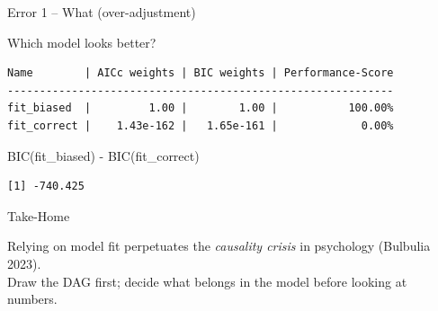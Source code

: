 \documentclass[
  ignorenonframetext,
  aspectratio=169,
]{beamer}
\newenvironment{Shaded}{\begin{snugshade}}{\end{snugshade}}
\newcommand{\FunctionTok}[1]{\textcolor[rgb]{0.28,0.35,0.67}{#1}}
\newcommand{\NormalTok}[1]{\textcolor[rgb]{0.00,0.23,0.31}{#1}}
\newcommand{\SpecialCharTok}[1]{\textcolor[rgb]{0.37,0.37,0.37}{#1}}
\begin{document}
\begin{frame}[fragile]{Error 1 -- What (over-adjustment)}
\begin{block}{Which model looks better?}
\begin{verbatim}
Name        | AICc weights | BIC weights | Performance-Score
------------------------------------------------------------
fit_biased  |         1.00 |        1.00 |           100.00%
fit_correct |    1.43e-162 |   1.65e-161 |             0.00%
\end{verbatim}

\begin{Shaded}
\begin{Highlighting}[]
\FunctionTok{BIC}\NormalTok{(fit\_biased) }\SpecialCharTok{{-}} \FunctionTok{BIC}\NormalTok{(fit\_correct)}
\end{Highlighting}
\end{Shaded}

\begin{verbatim}
[1] -740.425
\end{verbatim}
\end{block}

\begin{block}{Take-Home}
\label{take-home}
\begin{tcolorbox}[enhanced jigsaw, coltitle=black, left=2mm, colback=white, rightrule=.15mm, colframe=quarto-callout-important-color-frame, opacitybacktitle=0.6, arc=.35mm, colbacktitle=quarto-callout-important-color!10!white, toprule=.15mm, bottomtitle=1mm, breakable, toptitle=1mm, opacityback=0, titlerule=0mm, title=\textcolor{quarto-callout-important-color}{\faExclamation}\hspace{0.5em}{Important}, bottomrule=.15mm, leftrule=.75mm]

Relying on model fit perpetuates the \emph{causality crisis} in
psychology (Bulbulia 2023).\\
Draw the DAG first; decide what belongs in the model before looking at
numbers.

\end{tcolorbox}
\end{block}


\end{frame}
\end{document}
